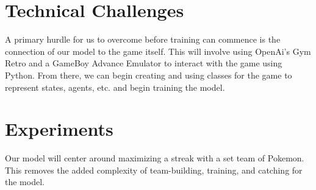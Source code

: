\documentclass[10pt,twocolumn,letterpaper]{article}
\begin{document}
\section{Technical Challenges}

A primary hurdle for us to overcome before training can commence is the connection of our model to
the game itself. This will involve using OpenAi's Gym Retro and a GameBoy Advance Emulator to interact
with the game using Python. From there, we can begin creating and using classes for the game
to represent states, agents, etc. and begin training the model. 

\section{Experiments}

Our model will center around maximizing a streak with a set team of Pokemon.
This removes the added complexity of team-building, training, and catching for
the model.












{\small


}
\end{document}
